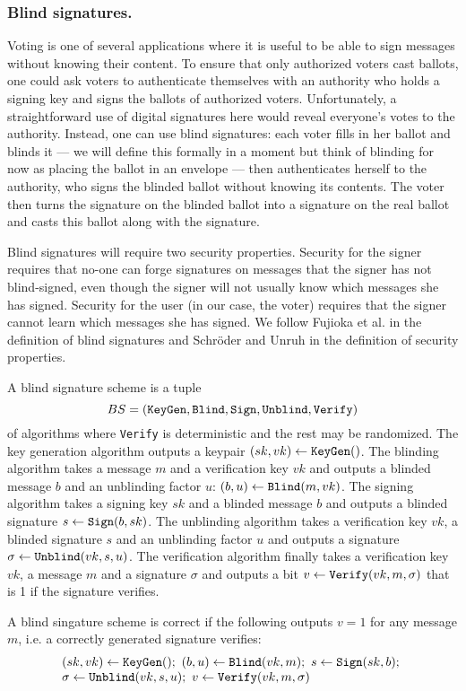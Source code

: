 \documentclass[envcountsame]{llncs}
\newcommand{\alg}[1]{\textup{\texttt{#1}}}
\begin{document}
\subsubsection{Blind signatures.}
Voting is one of several applications where it is useful to be able to sign
messages without knowing their content. To ensure that only authorized voters
cast ballots, one could ask voters to authenticate themselves with an authority
who holds a signing key and signs the ballots of authorized voters.
Unfortunately, a straightforward use of digital signatures here would reveal
everyone's votes to the authority. Instead, one can use blind signatures: each
voter fills in her ballot and blinds it --- we will define this formally in a
moment but think of blinding for now as placing the ballot in an envelope ---
then authenticates herself to the authority, who signs the blinded ballot
without knowing its contents. The voter then turns the signature on the blinded
ballot into a signature on the real ballot and casts this ballot along with the
signature.

Blind signatures will require two security properties. Security for the signer
requires that no-one can forge signatures on messages that the signer has not
blind-signed, even though the signer will not usually know which messages she
has signed. Security for the user (in our case, the voter) requires that the
signer cannot learn which messages she has signed. We follow Fujioka et al.
\cite{FOO92} in the definition of blind signatures and Schr\"oder and Unruh
\cite{US11} in the definition of security properties.

\begin{definition}
A blind signature scheme is a tuple
\[
BS = \left( \alg{KeyGen}, \alg{Blind}, \alg{Sign}, \alg{Unblind}, \alg{Verify} \right)
\]
of algorithms where \alg{Verify} is deterministic and the rest may be
randomized. The key generation algorithm outputs a keypair $(sk, vk) \gets
\alg{KeyGen}()$. The blinding algorithm takes a message $m$ and a verification
key $vk$ and outputs a blinded message $b$ and an unblinding factor $u$: $(b, u)
\gets \alg{Blind}(m, vk)$. The signing algorithm takes a signing key $sk$ and a
blinded message $b$ and outputs a blinded signature $s \gets \alg{Sign}(b, sk)$.
The unblinding algorithm takes a verification key $vk$, a blinded signature $s$
and an unblinding factor $u$ and outputs a signature $\sigma \gets
\alg{Unblind}(vk, s, u)$. The verification algorithm finally takes a
verification key $vk$, a message $m$ and a signature $\sigma$ and outputs a bit
$v \gets \alg{Verify}(vk, m, \sigma)$ that is 1 if the signature verifies.

A blind singature scheme is correct if the following outputs $v = 1$ for any
message $m$, i.e. a correctly generated signature verifies:
\[
\begin{array}{l}
(sk, vk) \gets \alg{KeyGen}();\ 
(b, u) \gets \alg{Blind}(vk, m);\ 
s \gets \alg{Sign}(sk, b);\ \\
\sigma \gets \alg{Unblind}(vk, s, u);\ 
v \gets \alg{Verify}(vk, m, \sigma)
\end{array}
\]
\end{definition}
\end{document}
